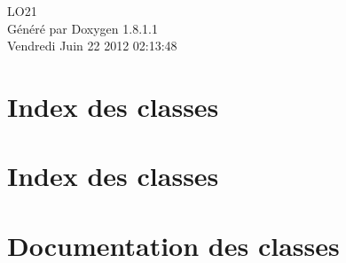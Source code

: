 \documentclass{book}
\begin{document}
\hypersetup{pageanchor=false,citecolor=blue}
\begin{titlepage}
\vspace*{7cm}
\begin{center}
{\Large L\-O21 }\\
\vspace*{1cm}
{\large Généré par Doxygen 1.8.1.1}\\
\vspace*{0.5cm}
{\small Vendredi Juin 22 2012 02:13:48}\\
\end{center}
\end{titlepage}
\clearemptydoublepage
{}
\tableofcontents
\clearemptydoublepage
{}
\hypersetup{pageanchor=true,citecolor=blue}
\chapter{Index des classes}

\chapter{Index des classes}

\chapter{Documentation des classes}





















\printindex
\end{document}
